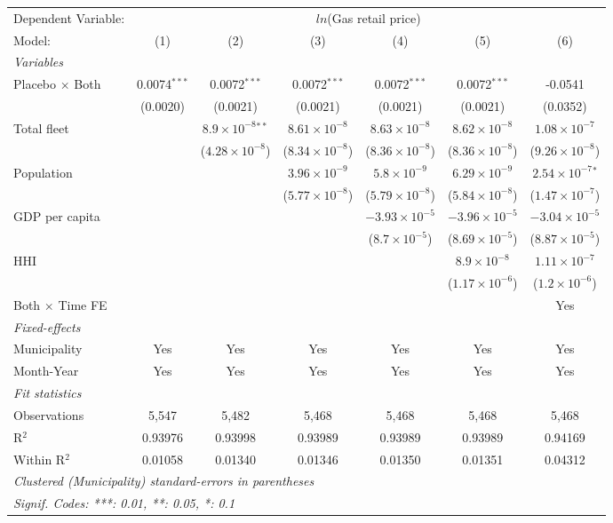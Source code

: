 \documentclass[
]{article}
\begin{document}
\begin{tabular}{lcccccc}
\tabularnewline\midrule\midrule
Dependent Variable:&\multicolumn{6}{c}{$ln$(Gas retail price)}\\
Model:&(1) & (2) & (3) & (4) & (5) & (6)\\
\midrule \emph{Variables}&   &   &   &   &   &  \\
Placebo $\times $ Both & 0.0074$^{***}$ & 0.0072$^{***}$ & 0.0072$^{***}$ & 0.0072$^{***}$ & 0.0072$^{***}$ & -0.0541\\
  &(0.0020) & (0.0021) & (0.0021) & (0.0021) & (0.0021) & (0.0352)\\
Total fleet &    & $8.9\times 10^{-8}$$^{**}$ & $8.61\times 10^{-8}$ & $8.63\times 10^{-8}$ & $8.62\times 10^{-8}$ & $1.08\times 10^{-7}$\\
  &   & ($4.28\times 10^{-8}$) & ($8.34\times 10^{-8}$) & ($8.36\times 10^{-8}$) & ($8.36\times 10^{-8}$) & ($9.26\times 10^{-8}$)\\
Population &    &    & $3.96\times 10^{-9}$ & $5.8\times 10^{-9}$ & $6.29\times 10^{-9}$ & $2.54\times 10^{-7}$$^{*}$\\
  &   &    & ($5.77\times 10^{-8}$) & ($5.79\times 10^{-8}$) & ($5.84\times 10^{-8}$) & ($1.47\times 10^{-7}$)\\
GDP per capita &    &    &    & $-3.93\times 10^{-5}$ & $-3.96\times 10^{-5}$ & $-3.04\times 10^{-5}$\\
  &   &    &    & ($8.7\times 10^{-5}$) & ($8.69\times 10^{-5}$) & ($8.87\times 10^{-5}$)\\
HHI &    &    &    &    & $8.9\times 10^{-8}$ & $1.11\times 10^{-7}$\\
  &   &    &    &    & ($1.17\times 10^{-6}$) & ($1.2\times 10^{-6}$)\\
Both $\times$ Time FE &  &  &  &  &  & Yes\\
\midrule \emph{Fixed-effects}&   &   &   &   &   &  \\
Municipality & Yes & Yes & Yes & Yes & Yes & Yes\\
Month-Year & Yes & Yes & Yes & Yes & Yes & Yes\\
\midrule \emph{Fit statistics}&  & & & & & \\
Observations & 5,547&5,482&5,468&5,468&5,468&5,468\\
R$^2$ & 0.93976&0.93998&0.93989&0.93989&0.93989&0.94169\\
Within R$^2$ & 0.01058&0.01340&0.01346&0.01350&0.01351&0.04312\\
\midrule\midrule\multicolumn{7}{l}{\emph{Clustered (Municipality) standard-errors in parentheses}}\\
\multicolumn{7}{l}{\emph{Signif. Codes: ***: 0.01, **: 0.05, *: 0.1}}\\
\end{tabular}
\end{document}

